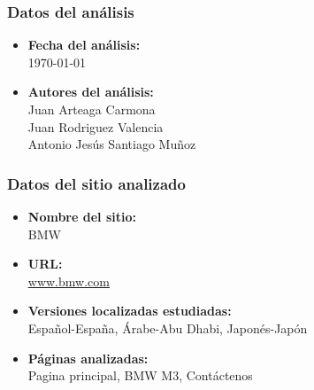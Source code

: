 \documentclass[a4paper,11pt]{article}
\begin{document}
\subsubsection{Datos del análisis}
\begin{itemize}
  \item \textbf{Fecha del análisis:}\\
  \today
  \item \textbf{Autores del análisis:}\\
      Juan Arteaga Carmona\\
      Juan Rodriguez Valencia\\
      Antonio Jesús Santiago Muñoz
\end{itemize}

\subsubsection{Datos del sitio analizado}
\begin{itemize}
\item \textbf{Nombre del sitio:}\\
BMW
\item \textbf{URL:}\\
\url{www.bmw.com}
\item \textbf{Versiones localizadas estudiadas:}\\
Español-España, Árabe-Abu Dhabi, Japonés-Japón
\item \textbf{Páginas analizadas:}\\
Pagina principal, BMW M3, Contáctenos
\end{itemize}
\end{document}
